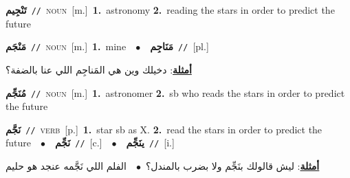 \documentclass[10pt,a4paper,twoside]{article} %
\begin{document}
\begin{multicols}{2}
{\setlength\topsep{0pt}\textbf{\foreignlanguage{arabic}{تَنْجِيم}}\ {\color{gray}\texttt{//}\color{black}}\ \textsc{noun}\ [m.]\ \textbf{1.}~astronomy  \textbf{2.}~reading the stars in order to predict the future\ } \vspace{2mm}

{\setlength\topsep{0pt}\textbf{\foreignlanguage{arabic}{مَنْجَم}}\ {\color{gray}\texttt{//}\color{black}}\ \textsc{noun}\ [m.]\ \textbf{1.}~mine\ \ $\bullet$\ \ \setlength\topsep{0pt}\textbf{\foreignlanguage{arabic}{مَنَاجِم}}\ {\color{gray}\texttt{//}\color{black}}\ [pl.]\  \begin{flushright}\color{gray}\foreignlanguage{arabic}{\textbf{\underline{\foreignlanguage{arabic}{أمثلة}}}: دخيلك وين هي المَناجِم اللي عنا بالضفة؟}\end{flushright}\color{black}} \vspace{2mm}

{\setlength\topsep{0pt}\textbf{\foreignlanguage{arabic}{مُنَجِّم}}\ {\color{gray}\texttt{//}\color{black}}\ \textsc{noun}\ [m.]\ \textbf{1.}~astronomer  \textbf{2.}~sb who reads the stars in order to predict the future\ } \vspace{2mm}

{\setlength\topsep{0pt}\textbf{\foreignlanguage{arabic}{نَجَّم}}\ {\color{gray}\texttt{//}\color{black}}\ \textsc{verb}\ [p.]\ \textbf{1.}~star sb as X.  \textbf{2.}~read the stars in order to predict the future\ \ $\bullet$\ \ \setlength\topsep{0pt}\textbf{\foreignlanguage{arabic}{نَجِّم}}\ {\color{gray}\texttt{//}\color{black}}\ [c.]\ \ $\bullet$\ \ \setlength\topsep{0pt}\textbf{\foreignlanguage{arabic}{ينَجِّم}}\ {\color{gray}\texttt{//}\color{black}}\ [i.]\  \begin{flushright}\color{gray}\foreignlanguage{arabic}{\textbf{\underline{\foreignlanguage{arabic}{أمثلة}}}: ليش قالولك بنَجِّم ولا بضرب بالمندل؟\ $\bullet$\ \  الفلم اللي نَجَّمه عنجد هو حليم}\end{flushright}\color{black}} \vspace{2mm}


\end{multicols}
\end{document}
